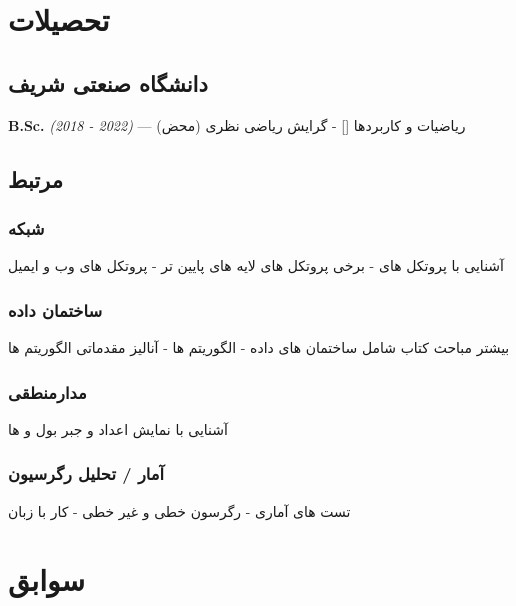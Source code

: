 \documentclass{article}
\begin{document}
\section{تحصیلات} %
\subsection{دانشگاه صنعتی شریف}
\textbf{B.Sc.} \textit{(2018 - 2022)} --- ریاضیات و کاربردها
[{\footnotesize {}}] -
گرایش ریاضی نظری (محض)
\subsection{مرتبط}
\subsubsection{شبکه}
آشنایی با پروتکل های  - برخی پروتکل های لایه های پایین تر - پروتکل های وب و ایمیل
\subsubsection{ساختمان داده}
بیشتر مباحث کتاب  شامل ساختمان های داده - الگوریتم ها - آنالیز مقدماتی الگوریتم ها
\subsubsection{مدارمنطقی}
آشنایی با نمایش اعداد و جبر بول و  ها
\subsubsection{آمار / تحلیل رگرسیون}
تست های آماری - رگرسون خطی و غیر خطی - کار با زبان 
\section{سوابق}
\end{document}
